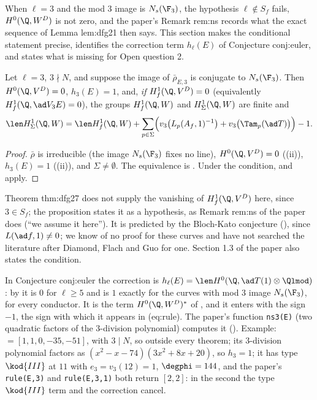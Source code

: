 When $\ell=3$ and the mod $3$ image is $N_s(\F_3)$, the hypothesis $\ell\notin S_f$ fails, $H^0(\Q,W^D)$ is not zero, and the paper's Remark rem:ns records what the
exact sequence of Lemma lem:dfg21 then says. This section makes the conditional statement precise, identifies the correction term $h_\ell(E)$ of Conjecture
conj:euler, and states what is missing for Open question 2.

\begin{proposition}\label{prop:blochkato:rem-ns}
Let $\ell=3$, $3\nmid N$, and suppose the image of $\bar\rho_{E,3}$ is conjugate to $N_s(\F_3)$. Then $H^0(\Q,V^D)=0$, $h_3(E)=1$, and, \emph{if} $H^1_f(\Q,V^D)=0$ (equivalently
$H^1_f(\Q,\ad V_3E)=0$), the groups $H^1_f(\Q,W)$ and $H^1_\Sigma(\Q,W)$ are finite and
\[
\len H^1_\Sigma(\Q,W)=\len H^1_f(\Q,W)+\sum_{p\in\Sigma}\Bigl(v_3\bigl(L_p(A_f,1)^{-1}\bigr)+v_3\bigl(\Tam_p(\ad T)\bigr)\Bigr)-1 .
\]
\end{proposition}

\begin{proof}
$\bar\rho$ is irreducible (the image $N_s(\F_3)$ fixes no line), $H^0(\Q,V^D)=0$ ((ii)), $h_3(E)=1$ ((ii)), and
$\Sigma\ne\emptyset$. The equivalence is . Under the condition,  and  apply.
\end{proof}

Theorem thm:dfg27 does not supply the vanishing of $H^1_f(\Q,V^D)$ here, since $3\in S_f$; the proposition states it as a hypothesis, as Remark rem:ns of the paper
does (``we assume it here''). It is predicted by the Bloch-Kato conjecture (), since $L(\ad f,1)\ne0$; we know of no proof for these
curves and have not searched the literature after Diamond, Flach and Guo for one. Section 1.3 of the paper also states the condition.

\begin{remark}\label{rem:blochkato:conj-euler-h}
In Conjecture conj:euler the correction is $h_\ell(E)=\len H^0(\Q,\ad T(1)\otimes\Qlmod)$: by  it is $0$ for $\ell\ge5$ and is $1$ exactly for the curves
with mod $3$ image $N_s(\F_3)$, for every conductor. It is the term $H^0(\Q,W^D)^*$ of , and it enters  with the sign $-1$,
the sign with which it appears in (eq:rule). The paper's function \texttt{ns3(E)} (two quadratic factors of the $3$-division polynomial) computes it ().
Example:  $=[1,1,0,-35,-51]$, with $3\mid N$, so outside every theorem; its $3$-division polynomial factors as $(x^2-x-74)(3x^2+8x+20)$, so $h_3=1$; it has
type $\kod{III}$ at $11$ with $e_3=v_3(12)=1$, $\degphi=144$, and the paper's \texttt{rule(E,3)} and \texttt{rule(E,3,1)} both return $[2,2]$: in the second the type
$\kod{III}$ term and the correction cancel.
\end{remark}

